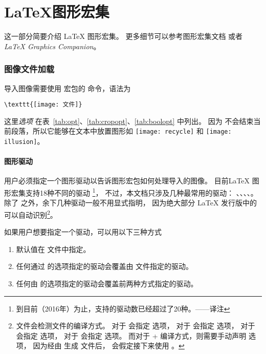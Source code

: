 \part{\LaTeX{}图形宏集}\label{part:graphicbundle}

这一部分简要介绍 \LaTeX{} 图形宏集。
更多细节可以参考图形宏集文档 \cite{grfguide} 或者 \emph{\LaTeX{} Graphics Companion}\cite{Goossens1997}。

\section{图像文件加载}\label{sec:graphicsinclusion}

导入图像需要使用  宏包的  命令，语法为
\begin{lstlisting}[frame=shadowbox]
\texttt{[image: 文件]}
\end{lstlisting}
这里\emph{选项} 在表~\ref{tab:opt}、\ref{tab:cropopt}、\ref{tab:boolopt} 中列出。
因为  不会结束当前段落，所以它能够在文本中放置图形如
 \texttt{[image: recycle]} 和 \texttt{[image: illusion]}。

\subsection{图形驱动}\label{ssec:driver}
用户必须指定一个图形驱动以告诉图形宏包如何处理导入的图像。
目前\LaTeX{} 图形宏集支持18种不同的驱动
\footnote{
	到目前（2016年）为止，支持的驱动数已经超过了20种。——译注}，
不过，本文档只涉及几种最常用的驱动：
、、、、。
除了  之外，余下几种驱动一般不用显式指明，
因为绝大部分 \LaTeX{} 发行版中的  可以自动识别\footnote{
     文件会检测文件的编译方式。
	对于  会指定  选项，
	对于  会指定  选项，
	对于  会指定  选项，
	对于  会指定  选项。
	而对于 + 编译方式，则需要手动声明  选项，
	因为经由  生成  文件后，
	 会假定接下来使用 。}。

如果用户想要指定一个驱动，可以用以下三种方式
\begin{enumerate}
	\item 默认值在  文件中指定。
	\item 任何通过  的选项指定的驱动会覆盖由  文件指定的驱动。
	\item 任何由  的选项指定的驱动会覆盖前两种方式指定的驱动。
\end{enumerate}

